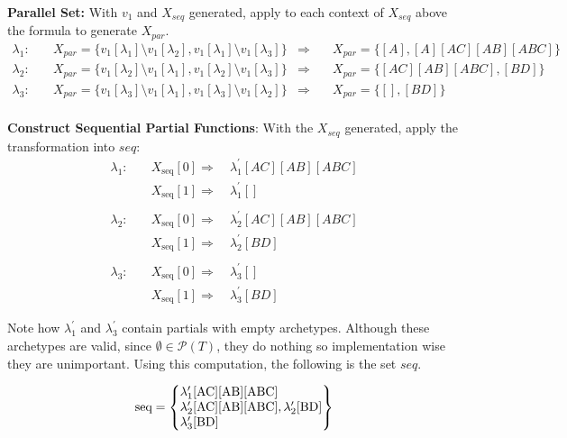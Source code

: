 \textbf{Parallel Set:} With $v_1$ and $X_{seq}$ generated, apply to each context of $X_{seq}$ above the formula to generate $X_{par}$.
\begin{align*}
    \lambda_1: \quad & X_{par} = \{v_1[\lambda_1] \setminus v_1[\lambda_2], v_1[\lambda_1] \setminus v_1[\lambda_3]\} & \Rightarrow & \quad X_{par} = \{[A],[A][AC][AB][ABC]\} \\ 
    \lambda_2: \quad & X_{par} = \{v_1[\lambda_2] \setminus v_1[\lambda_1], v_1[\lambda_2] \setminus v_1[\lambda_3]\} & \Rightarrow & \quad X_{par} = \{[AC][AB][ABC],[BD]\} \\ 
    \lambda_3: \quad & X_{par} = \{v_1[\lambda_3] \setminus v_1[\lambda_1], v_1[\lambda_3] \setminus v_1[\lambda_2]\} & \Rightarrow & \quad X_{par} = \{[],[BD]\} \\ 
\end{align*}

\textbf{Construct Sequential Partial Functions}: With the $X_{seq}$ generated, apply the transformation into $seq$:
\begin{align*}
    \lambda_1: \quad & X_{\text{seq}}[0]  \Rightarrow \quad \lambda_1^\prime[AC][AB][ABC] \\
                     & X_{\text{seq}}[1]  \Rightarrow \quad \lambda_1^\prime[] \\ 
    \\[0.3em]
    \lambda_2: \quad & X_{\text{seq}}[0]  \Rightarrow \quad \lambda_2^\prime[AC][AB][ABC] \\
                     & X_{\text{seq}}[1]  \Rightarrow \quad \lambda_2^\prime[BD] \\
    \\[0.3em]
    \lambda_3: \quad & X_{\text{seq}}[0]  \Rightarrow \quad \lambda_3^\prime[] \\
                     & X_{\text{seq}}[1]  \Rightarrow \quad \lambda_3^\prime[BD]
\end{align*}

Note how $\lambda_1^\prime$ and $\lambda_3^\prime$ contain partials with empty archetypes. Although these archetypes are valid, since $\emptyset \in \mathcal{P}(T)$, they do nothing so implementation wise they are unimportant. Using this computation, the following is the set $seq$.

$$
\text{seq} = \left\{
\begin{array}{@{}l@{}}
    \lambda_1^\prime[\text{AC}][\text{AB}][\text{ABC}] \\ 
    \lambda_2^\prime[\text{AC}][\text{AB}][\text{ABC}], \lambda_2^\prime[\text{BD}] \\
    \lambda_3^\prime[\text{BD}]
\end{array}
\right\}
$$

